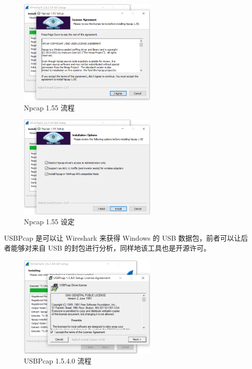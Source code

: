 \begin{figure}[htb]
\centering 
\includegraphics[width=0.60\textwidth]{img/ch1s1m5.png} 
\caption{Npcap 1.55 流程}
\label{Test}
\end{figure}

\begin{figure}[htb]
\centering 
\includegraphics[width=0.60\textwidth]{img/ch1s1m6.png} 
\caption{Npcap 1.55 设定}
\label{Test}
\end{figure}

USBPcap 是可以让 Wireshark 来获得 Windows 的 USB 数据包，前者可以让后者能够对来自 USB 的封包进行分析，同样地该工具也是开源许可。

\begin{figure}[htb]
\centering 
\includegraphics[width=0.60\textwidth]{img/ch1s1m7.png} 
\caption{USBPcap 1.5.4.0 流程}
\label{Test}
\end{figure}

